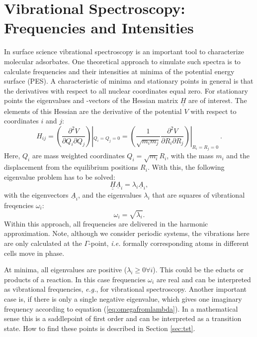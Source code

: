 \documentclass[11pt,DIV=13,BCOR=5mm,a4paper,headinclude]{scrbook}
\renewcommand{\vec}[1]{\underline{#1}}
\def\doubleunderline#1{\underline{\underline{#1}}}
\begin{document}
\section{Vibrational Spectroscopy: Frequencies and Intensities}
In surface science vibrational spectroscopy is an important tool to characterize molecular adsorbates.
One theoretical approach to simulate such spectra is to calculate frequencies and their intensities at minima of the potential energy surface (PES).
A characteristic of minima and stationary points in general is that the derivatives with respect to all nuclear coordinates equal zero.
For stationary points the eigenvalues and -vectors of the Hessian matrix $\doubleunderline{H}$ are of interest.
The elements of this Hessian are the derivative of the potential $V$ with respect to coordinates $i$ and $j$:
\begin{equation}
 H_{ij}=\left( \frac{\partial^2 V}{\partial Q_i \partial Q_j} \right)|_{Q_i=Q_j=0}=\left(\frac{1}{\sqrt{m_i m_j}} \frac{\partial^2 V}{\partial R_i \partial R_j} \right)|_{R_i=R_j=0} ~.
\end{equation}
Here, $Q_i$ are mass weighted coordinates $Q_i=\sqrt{m_i}R_i$, with the mass $m_i$ and the displacement from the equilibrium positions $R_i$.
With this, the following eigenvalue problem has to be solved:
\begin{equation}
 \doubleunderline{H} \vec{A}_i=\lambda_i\vec{A}_i,
\end{equation}
with the eigenvectors $\vec{A}_i$, and the eigenvalues $\lambda_i$ that are squares of vibrational freqencies $\omega_i$: 
\begin{equation}\label{eq:omegafromlambda}
 \omega_i=\sqrt{\lambda_i}.
\end{equation}
Within this approach, all frequencies are delivered in the harmonic approximation.
Note, although we consider periodic systems, the vibrations here are only calculated at the $\Gamma$-point, \textit{i.e.} formally corresponding atoms in different cells move in phase.


At minima, all eigenvalues are positive ($\lambda_i\geq 0 \forall i$).
This could be the educts or products of a reaction.
In this case frequencies $\omega_i$ are real and can be interpreted as vibrational frequencies, \textit{e.g.}, for vibrational spectroscopy.
Another important case is, if there is only a single negative eigenvalue, which gives one imaginary frequency according to equation (\ref{eq:omegafromlambda}).
In a mathematical sense this is a saddlepoint of first order and can be interpreted as a transition state.
How to find these points is described in Section \ref{sec:tst}.
\\\\
\end{document}
